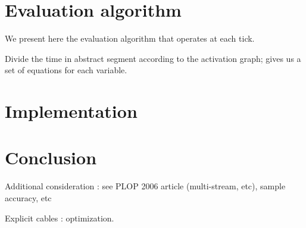 \documentclass{article}
\begin{document}
	\section{Evaluation algorithm}
    We present here the evaluation algorithm that operates at each tick.
    
    
	Divide the time in abstract segment according to the activation graph; gives us a set of equations for each variable.
	\section{Implementation}
    \section{Conclusion}
    Additional consideration : see PLOP 2006 article (multi-stream, etc), sample accuracy, etc
    
    Explicit cables : optimization.
\end{document}
